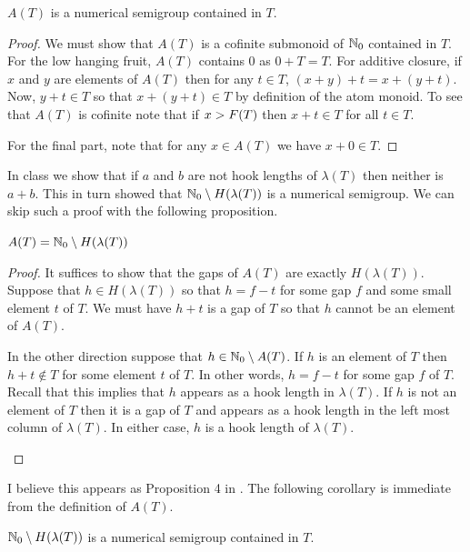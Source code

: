 \begin{proposition}
    \(A(T)\) is a numerical semigroup contained in \(T\).
\end{proposition}
\begin{proof}
    We must show that \(A(T)\) is a cofinite submonoid of \(\mathbb{N}_0\) contained in \(T\). For the low hanging fruit, \(A(T)\) contains \(0\) as \(0 + T = T\). For additive closure, if \(x\) and \(y\) are elements of \(A(T)\) then for any \(t \in T\), \((x + y) + t = x + (y + t)\). Now, \(y + t \in T\) so that \(x + (y + t) \in T\) by definition of the atom monoid. To see that \(A(T)\) is cofinite note that if \(x > F(T)\) then \(x + t \in T\) for all \(t \in T\). 
    
    For the final part, note that for any \(x \in A(T)\) we have \(x + 0 \in T\). 
\end{proof}

In class we show that if \(a\) and \(b\) are not hook lengths of \(\lambda(T)\) then neither is \(a + b\). This in turn showed that \(\mathbb{N}_0 \setminus H(\lambda(T))\) is a numerical semigroup. We can skip such a proof with the following proposition.

\begin{proposition}
    \(A(T) = \mathbb{N}_0 \setminus H(\lambda(T))\)
\end{proposition}
\begin{proof}
    It suffices to show that the gaps of \(A(T)\) are exactly \(H(\lambda(T))\). Suppose that \(h \in H(\lambda(T))\) so that \(h = f - t\) for some gap \(f\) and some small element \(t\) of \(T\). We must have \(h + t\) is a gap of \(T\) so that \(h\) cannot be an element of \(A(T)\).

    In the other direction suppose that \(h \in \mathbb{N}_0 \setminus A(T)\). If \(h\) is an element of \(T\) then \(h + t \not\in T\) for some element \(t\) of \(T\). In other words, \(h = f - t\) for some gap \(f\) of \(T\). Recall that this implies that \(h\) appears as a hook length in \(\lambda(T)\). If \(h\) is not an element of \(T\) then it is a gap of \(T\) and appears as a hook length in the left most column of \(\lambda(T)\). In either case, \(h\) is a hook length of \(\lambda(T)\).

    \label{proposition:AtomHookset}
\end{proof}

I believe this appears as Proposition 4 in \cite{Constantin2017}. The following corollary is immediate from the definition of \(A(T)\).

\begin{corollary}
    \(\mathbb{N}_0 \setminus H(\lambda(T))\) is a numerical semigroup contained in \(T\).
\end{corollary}

